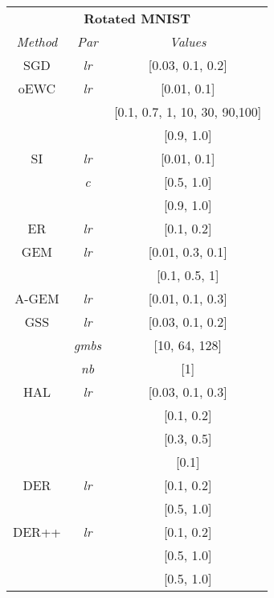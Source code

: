 \documentclass{article}
\begin{document}
{\begin{table}[H]
\begin{multicols}{3}
\begin{tabular}{ccc}
\toprule
\multicolumn{3}{c}{\textbf{Rotated MNIST}}\\
\textit{Method} & \textit{Par} & \textit{Values} \\
\midrule
SGD   & \textit{lr} & [0.03, 0.1, 0.2] \\
\midrule
oEWC  & \textit{lr} & [0.01, 0.1] \\
& 	  \textit{} & [0.1, 0.7, 1, 10, 30, 90,100] \\
& 	  \textit{} & [0.9, 1.0] \\
\midrule
SI  & \textit{lr} & [0.01, 0.1] \\
& 	  \textit{c} & [0.5, 1.0] \\
& 	  \textit{} & [0.9, 1.0] \\
\midrule
ER  & \textit{lr} & [0.1, 0.2] \\
\midrule
GEM  & \textit{lr} & [0.01, 0.3, 0.1] \\
&  \textit{} & [0.1, 0.5, 1]\\
\midrule
A-GEM & \textit{lr} & [0.01, 0.1, 0.3] \\
\midrule
GSS  & \textit{lr} & [0.03, 0.1, 0.2] \\
& 	 \textit{gmbs} & [10, 64, 128] \\
& 	 \textit{nb} & [1] \\
\midrule
HAL  & \textit{lr} & [0.03, 0.1, 0.3] \\
& 	 \textit{} & [0.1, 0.2] \\
& 	 \textit{} & [0.3, 0.5] \\
& 	 \textit{} & [0.1] \\
\midrule
DER & \textit{lr} & [0.1, 0.2] \\
& 	 \textit{} & [0.5, 1.0] \\
\midrule
DER++ & \textit{lr} & [0.1, 0.2] \\
& 	  \textit{} & [0.5, 1.0] \\
& 	  \textit{} & [0.5, 1.0] \\
\bottomrule
\end{tabular}


\end{multicols}
\end{table}}
\end{document}
